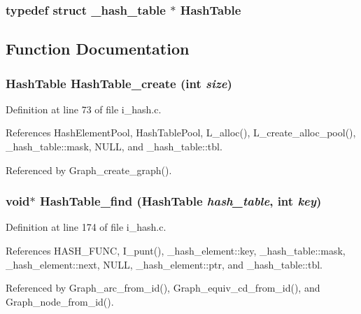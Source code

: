 \subsubsection{\setlength{\rightskip}{0pt plus 5cm}typedef struct \bf{\_\-hash\_\-table} $\ast$ \bf{Hash\-Table}}\label{i__hash_8h_0b5863c4711cbbfcf62b569f32b89809}




\subsection{Function Documentation}
\subsubsection{\setlength{\rightskip}{0pt plus 5cm}\bf{Hash\-Table} Hash\-Table\_\-create (int {\em size})}\label{i__hash_8h_ccc5de33b1b451799d22a19f9d768c6a}




Definition at line 73 of file i\_\-hash.c.

References Hash\-Element\-Pool, Hash\-Table\-Pool, L\_\-alloc(), L\_\-create\_\-alloc\_\-pool(), \_\-hash\_\-table::mask, NULL, and \_\-hash\_\-table::tbl.

Referenced by Graph\_\-create\_\-graph().
\subsubsection{\setlength{\rightskip}{0pt plus 5cm}void$\ast$ Hash\-Table\_\-find (\bf{Hash\-Table} {\em hash\_\-table}, int {\em key})}\label{i__hash_8h_a4b73ed98723e1c8083a9ceda8ffe15d}




Definition at line 174 of file i\_\-hash.c.

References HASH\_\-FUNC, I\_\-punt(), \_\-hash\_\-element::key, \_\-hash\_\-table::mask, \_\-hash\_\-element::next, NULL, \_\-hash\_\-element::ptr, and \_\-hash\_\-table::tbl.

Referenced by Graph\_\-arc\_\-from\_\-id(), Graph\_\-equiv\_\-cd\_\-from\_\-id(), and Graph\_\-node\_\-from\_\-id().
